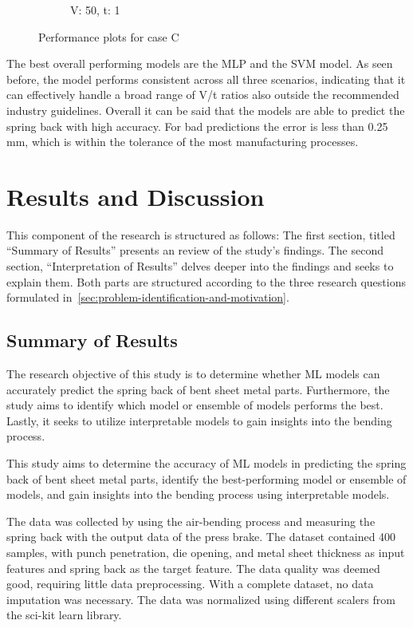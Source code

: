 \begin{figure}[h]
\begin{tcolorbox}[arc=0pt,boxrule=0.5pt]
\begin{subfigure}{0.5\textwidth}
            \caption{V: 50, t: 1}
            \label{fig:performance-50_1}
        \end{subfigure}
    \end{tcolorbox}
    \caption{Performance plots for case C}
    \label{fig:performance-case-c}
\end{figure}

The best overall performing models are the \ac{MLP} and the \ac{SVM} model.
As seen before, the model performs consistent across all three scenarios, indicating that it can
effectively handle a broad range of V/t ratios also outside the recommended industry guidelines.
Overall it can be said that the models are able to predict the spring back with high accuracy.
For bad predictions the error is less than 0.25 mm, which is within the tolerance of the
most manufacturing processes.


\section{Results and Discussion}\label{sec:results-and-discussion}
This component of the research is structured as follows:
The first section, titled ``Summary of Results'' presents an review of the study's findings.
The second section, ``Interpretation of Results'' delves deeper into the findings and seeks to explain them.
Both parts are structured according to the three research questions formulated
in~\cref{sec:problem-identification-and-motivation}.

\subsection{Summary of Results}\label{subsec:summary-of-results}
The research objective of this study is to determine whether \ac{ML} models can accurately predict the spring back of
bent sheet metal parts.
Furthermore, the study aims to identify which model or ensemble of models performs the best.
Lastly, it seeks to utilize interpretable models to gain insights into the bending process.


This study aims to determine the accuracy of \ac{ML} models in predicting the spring back of bent sheet metal parts,
identify the best-performing model or ensemble of models, and gain insights into the bending process using
interpretable models.

The data was collected by using the air-bending process and measuring the spring back with the output data of the
press brake.
The dataset contained 400 samples, with punch penetration, die opening, and metal sheet thickness as
input features and spring back as the target feature.
The data quality was deemed good, requiring little data preprocessing.
With a complete dataset, no data imputation was necessary.
The data was normalized using different scalers from the sci-kit learn library.

